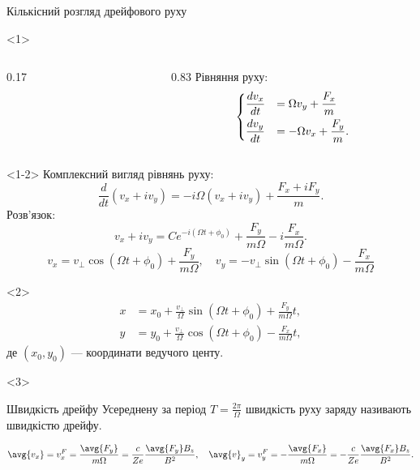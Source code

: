 \documentclass[]{beamer}
\begin{document}
\begin{frame}{Кількісний розгляд дрейфового руху}{}\small
	\begin{onlyenv}
		\begin{columns}
			\begin{column}{0.17\linewidth}
				\begin{center}
					
				\end{center}
			\end{column}
			\begin{column}{0.83\linewidth}\small
				Рівняння руху:
				\begin{equation*}
					\begin{dcases}
						\frac{dv_x}{dt} & = \Omega v_y + \frac{F_x}{m}   \\
						\frac{dv_y}{dt} & = -\Omega v_x + \frac{F_y}{m}.
					\end{dcases}
				\end{equation*}
			\end{column}
		\end{columns}
	\end{onlyenv}
	\begin{onlyenv}<1-2>
		Комплексний вигляд рівнянь руху:
		\begin{equation*}
			\frac{d}{dt}(v_x + iv_y) = -i\Omega(v_x + iv_y) + \frac{F_x + iF_y}{m}.
		\end{equation*}
		Розв'язок:
		\begin{equation*}
			v_x + iv_y = Ce^{-i(\Omega t + \phi_0)} + \frac{F_y}{m\Omega} - i\frac{F_x}{m\Omega}.
		\end{equation*}
		\begin{equation*}
			v_x = v_\perp\cos(\Omega t + \phi_0) + \frac{F_y}{m\Omega},\quad
			v_y = - v_\perp\sin(\Omega t + \phi_0) - \frac{F_x}{m\Omega}
		\end{equation*}
	\end{onlyenv}
	\begin{onlyenv}
		\begin{align*}
			x &= x_0 +  \frac{v_\perp}{\Omega}\sin(\Omega t + \phi_0) + \frac{F_y}{m\Omega} t, \\
			y &= y_0 + \frac{v_\perp}{\Omega}\cos(\Omega t + \phi_0) - \frac{F_x}{m\Omega} t,
		\end{align*}
        де $(x_0, y_0)$ --- координати ведучого центу.
	\end{onlyenv}
	\begin{onlyenv}
		\begin{block}{Швидкість дрейфу}
			Усереднену за період $T = \frac{2\pi}{\Omega}$ швидкість руху заряду називають \alert{швидкістю дрейфу}.
		\end{block}
		\begin{equation*}
			\avg{v_x} = v^F_x = \frac{\avg{F_y}}{m\Omega} =  \frac{c}{Ze} \frac{\avg{F_y} B_z}{B^2},\quad
			\avg{v}_y = v^F_y = - \frac{\avg{F_x}}{m\Omega} =  - \frac{c}{Ze} \frac{\avg{F_x} B_z}{B^2}.
		\end{equation*}


\end{onlyenv}
\end{frame}
\end{document}
